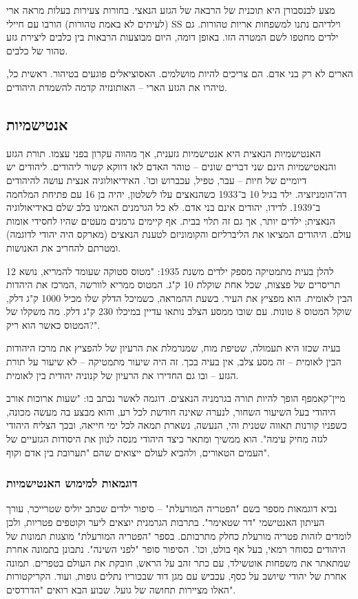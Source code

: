 \documentclass[a4paper]{book}
\begin{document}
	מצע לבנסבורן היא תוכנית של הרבאה של הגזע הנאצי. בחורות צעירות בעלות מראה ארי (לעיתים לא באמת טהורות) הורבו עם חיילי SS וילדיהם נתנו למשפחות אריות טהורות. גם ילדים מחטפו לשם המטרה הזו. באופן דומה, היום מבוצעות הרבאות בין כלבים ליצירת גזע טהור של כלבים. 
	
	הארים לא רק בני אדם. הם צריכים להיות מושלמים. האסוציאלים פוגעים בטיהור. ראשית כל, טיהרו את הגזע הארי – האותונזיה קדמה להשמדת היהודים. 
	
	\subsection{אנטישמיות}
	האנטישמיות הנאצית היא אנטישמיות גזענית, אך מהווה עקרון בפני עצמו. תורת הגזע והנאטישמיות הינם שני דברים שונים – טוהר האדם לאו דווקא קשור ליהודים. ליהודים יש דיומיים של חיות – עבר, טפיל, עכברוש וכו'. האידיאולוגיה אנצית עושה להיהודים דה־הומניזציה. ילד בגיל 10 ב־1933 כשהנאצים עלו לשלטון, יהיה בן 16 עם פתיחת המלחמה ב־1939. לדידו, יהודים אינם בני אדם. לא כל הגרמנים האמינו בלב שלם באידיאולוגיה הנאצית; ילדים יותר, אך גם זה תלוי בבית. אף קיימים גרמנים מעטים שהיו לחסידי אומות עולם. היהודים המציאו את הליברליזם והקומוניזם לטענת הנאצים (מארקס היה יהודי לדוגמה) ומטרתם להחריב את האנושות. 
	
	להלן בעית מתמטיקה מספק ילדים משנת 1935: 
	"מטוס סטוקה שעומד להמריא, נושא 12 תריסרים של פצצות, שכל אחת שוקלת 10 ק"ג. המטוס ממריא לוורשה ,המרכז את היהדות הבין לאומית. הוא מפציץ את העיר. בשעת ההמראה, כשמיכל הדלק שלו מכיל 1000 ק"ג דלק, שוקל המטוס 8 טונות. עם שובו ממסע הצלב נותאו עדיין במיכלו 230 ק"ג דלק. מה משקלו של המטוס כאשר הוא ריק?". 
	
	בעיה שכזו היא תעמולה, שטיפת מוח, שמנרמלת את הרעיון של להפציץ את מרכז היהודות הבין לאומית – זה מסע צלב, אין בעיה בכך. זה היה שיעור מתמטיקה – לא שיעור על תורת הגזע – ובו גם החדירו את הרעיון של קנוניה יהודית בין לאומית. 
	
	מיין־קאמפף הופך להיות תורה בגרמניה הנאצים. דוגמה לאשר נכתב בו: "שעות ארוכות אורב היהודי בעל השיעור השחור, לנערה שאינה חודשת לכל רע, והוא מבצע בה מעשה מכונה, כשפניו קורנות תאווה שטנית והי, הנעשה, נשארת תמאה לכל ימי חייאה, ובכך הצליח היהודי לגזה מחיק עימה". הוא ממשיך ומתאר כיצד היהודי מנסה לנוון את היסודות הגזעיים של העמים הטאורים, ולהביא לעולם ייצואים שהם "תערובת בין אדם וקוף". 
	
	\subsubsection{דוגמאות למימוש האנטישמיות}
	נביא דוגמאות מספר בשם "הפטריה המורעלת" – סיפור ילדים שכתב יוליס שטרייכר, עורך העיתון האנטישמי "דר שטאימר". בתרבות הגרמנית יוצאים ליער וקוטפים פטריות, ולכן לומדים לזהות פטריה מורעלת כחלק מתרבותם. בספר "הפטריה המורעלת" מוצגות תמונות של היהודים כסוחר רמאי, בעל אף בולט, וכו'. הסיפור סופר "לפני השינה". נתבונן בתמונה  אחרת שמתאתר את משפחות אוטשילד, עם כתר זהב על הראש, חובקת את העולם בטפרים. תמונה אחרת של יהודי שיושב על כסף, עכביש עם מגן דוד שבכוריו נתלים גופות, ועוד. הקריקטורות האלו מציירות תחושה של גועל. שבוע הבא רואים "הדרדסים". 
	
\end{document}

